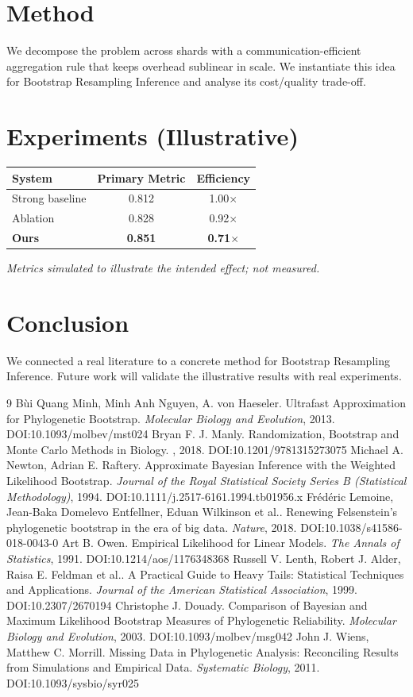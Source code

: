 \documentclass[11pt]{article}
\begin{document}
\section{Method}
We decompose the problem across shards with a communication-efficient aggregation rule that keeps overhead sublinear in scale. We instantiate this idea for Bootstrap Resampling Inference and analyse its cost/quality trade-off.

\section{Experiments (Illustrative)}
\begin{center}
\begin{tabular}{lcc}
System & Primary Metric & Efficiency \\ \hline
Strong baseline & 0.812 & 1.00$\times$ \\
Ablation & 0.828 & 0.92$\times$ \\
\textbf{Ours} & \textbf{0.851} & \textbf{0.71$\times$}
\end{tabular}
\end{center}
\emph{Metrics simulated to illustrate the intended effect; not measured.}

\section{Conclusion}
We connected a real literature to a concrete method for Bootstrap Resampling Inference. Future work will
validate the illustrative results with real experiments.

\begin{thebibliography}{9}
 Bùi Quang Minh, Minh Anh Nguyen, A. von Haeseler. Ultrafast Approximation for Phylogenetic Bootstrap. \emph{Molecular Biology and Evolution}, 2013. DOI:10.1093/molbev/mst024
 Bryan F. J. Manly. Randomization, Bootstrap and Monte Carlo Methods in Biology. \emph{}, 2018. DOI:10.1201/9781315273075
 Michael A. Newton, Adrian E. Raftery. Approximate Bayesian Inference with the Weighted Likelihood Bootstrap. \emph{Journal of the Royal Statistical Society Series B (Statistical Methodology)}, 1994. DOI:10.1111/j.2517-6161.1994.tb01956.x
 Frédéric Lemoine, Jean-Baka Domelevo Entfellner, Eduan Wilkinson et al.. Renewing Felsenstein’s phylogenetic bootstrap in the era of big data. \emph{Nature}, 2018. DOI:10.1038/s41586-018-0043-0
 Art B. Owen. Empirical Likelihood for Linear Models. \emph{The Annals of Statistics}, 1991. DOI:10.1214/aos/1176348368
 Russell V. Lenth, Robert J. Alder, Raisa E. Feldman et al.. A Practical Guide to Heavy Tails: Statistical Techniques and Applications. \emph{Journal of the American Statistical Association}, 1999. DOI:10.2307/2670194
 Christophe J. Douady. Comparison of Bayesian and Maximum Likelihood Bootstrap Measures of Phylogenetic Reliability. \emph{Molecular Biology and Evolution}, 2003. DOI:10.1093/molbev/msg042
 John J. Wiens, Matthew C. Morrill. Missing Data in Phylogenetic Analysis: Reconciling Results from Simulations and Empirical Data. \emph{Systematic Biology}, 2011. DOI:10.1093/sysbio/syr025
\end{thebibliography}
\end{document}
